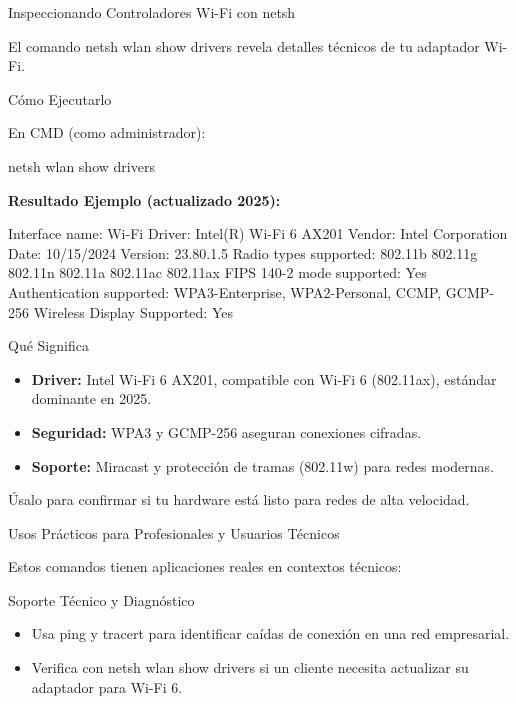 \documentclass[
  doc,
  floatsintext,
  longtable,
  a4paper,
  nolmodern,
  notxfonts,
  notimes,
  colorlinks=true,linkcolor=blue,citecolor=blue,urlcolor=blue]{apa7}
\newenvironment{Shaded}{\begin{snugshade}}{\end{snugshade}}
\newcommand{\NormalTok}[1]{\textcolor[rgb]{0.00,0.23,0.31}{#1}}
\providecommand{\tightlist}{%
  \setlength{\itemsep}{0pt}\setlength{\parskip}{0pt}}
\begin{document}
Inspeccionando Controladores Wi-Fi con netsh

El comando netsh wlan show drivers revela detalles técnicos de tu
adaptador Wi-Fi.

Cómo Ejecutarlo

En CMD (como administrador):

\begin{Shaded}
\begin{Highlighting}[]
\NormalTok{netsh wlan show drivers}
\end{Highlighting}
\end{Shaded}

\textbf{Resultado Ejemplo (actualizado 2025):}

\begin{Shaded}
\begin{Highlighting}[]
\NormalTok{Interface name: Wi{-}Fi}
\NormalTok{Driver: Intel(R) Wi{-}Fi 6 AX201}
\NormalTok{Vendor: Intel Corporation}
\NormalTok{Date: 10/15/2024}
\NormalTok{Version: 23.80.1.5}
\NormalTok{Radio types supported: 802.11b 802.11g 802.11n 802.11a 802.11ac 802.11ax}
\NormalTok{FIPS 140{-}2 mode supported: Yes}
\NormalTok{Authentication supported: WPA3{-}Enterprise, WPA2{-}Personal, CCMP, GCMP{-}256}
\NormalTok{Wireless Display Supported: Yes}
\end{Highlighting}
\end{Shaded}

Qué Significa

\begin{itemize}
\tightlist
\item
  \textbf{Driver:} Intel Wi-Fi 6 AX201, compatible con Wi-Fi 6
  (802.11ax), estándar dominante en 2025.
\item
  \textbf{Seguridad:} WPA3 y GCMP-256 aseguran conexiones cifradas.
\item
  \textbf{Soporte:} Miracast y protección de tramas (802.11w) para redes
  modernas.
\end{itemize}

Úsalo para confirmar si tu hardware está listo para redes de alta
velocidad.

Usos Prácticos para Profesionales y Usuarios Técnicos

Estos comandos tienen aplicaciones reales en contextos técnicos:

Soporte Técnico y Diagnóstico

\begin{itemize}
\tightlist
\item
  Usa ping y tracert para identificar caídas de conexión en una red
  empresarial.
\item
  Verifica con netsh wlan show drivers si un cliente necesita actualizar
  su adaptador para Wi-Fi 6.
\end{itemize}
\end{document}
